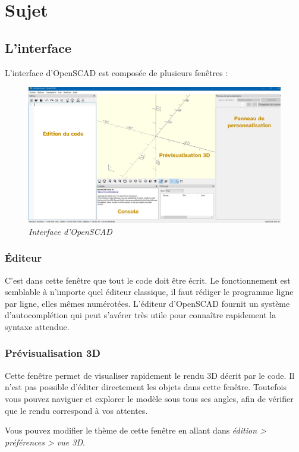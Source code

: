 \section{Sujet}

\subsection{L'interface}

L'interface d'OpenSCAD est composée de plusieurs fenêtres :


\begin{figure}[h]
	\centering
	\includegraphics[width=12cm]{images/interface}
	\caption{\textit{Interface d'OpenSCAD}}
\end{figure}


\subsubsection{Éditeur}

C'est dans cette fenêtre que tout le code doit être écrit.
Le fonctionnement est semblable à n'importe quel éditeur classique, il faut rédiger le programme ligne par ligne, elles mêmes numérotées.
L'éditeur d'OpenSCAD fournit un système d'autocomplétion qui peut s'avérer très utile pour connaître rapidement la syntaxe attendue.


\subsubsection{Prévisualisation 3D}

Cette fenêtre permet de visualiser rapidement le rendu 3D décrit par le code.
Il n'est pas possible d'éditer directement les objets dans cette fenêtre.
Toutefois vous pouvez naviguer et explorer le modèle sous tous ses angles, afin de vérifier que le rendu correspond à vos attentes.

Vous pouvez modifier le thème de cette fenêtre en allant dans \textit{édition > préférences > vue 3D}.

